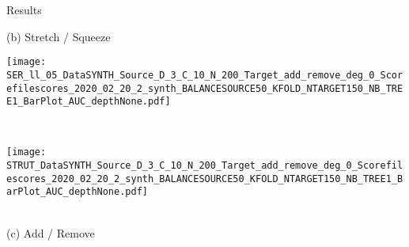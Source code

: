 \begin{frame}{Results}
\begin{minipage}[t]{0.33\linewidth}
            \medskip
            {\small(b)\; Stretch / Squeeze}
        \end{minipage}
        \begin{minipage}[t]{0.33\linewidth}\vspace{0pt}
            \centering
            \begin{minipage}[t]{\ratio\linewidth}\vspace{0pt}
            \centerline{\texttt{[image: SER\_ll\_05\_DataSYNTH\_Source\_D\_3\_C\_10\_N\_200\_Target\_add\_remove\_deg\_0\_Scorefilescores\_2020\_02\_20\_2\_synth\_BALANCESOURCE50\_KFOLD\_NTARGET150\_NB\_TREE1\_BarPlot\_AUC\_depthNone.pdf]}}
            \end{minipage}\\
            \begin{minipage}[t]{\ratio\linewidth}\vspace{0cm}
            \centerline{\texttt{[image: STRUT\_DataSYNTH\_Source\_D\_3\_C\_10\_N\_200\_Target\_add\_remove\_deg\_0\_Scorefilescores\_2020\_02\_20\_2\_synth\_BALANCESOURCE50\_KFOLD\_NTARGET150\_NB\_TREE1\_BarPlot\_AUC\_depthNone.pdf]}}
            \end{minipage}\\
            \medskip
            {\small(c)\; Add / Remove}
        \end{minipage}

    
\end{frame}

